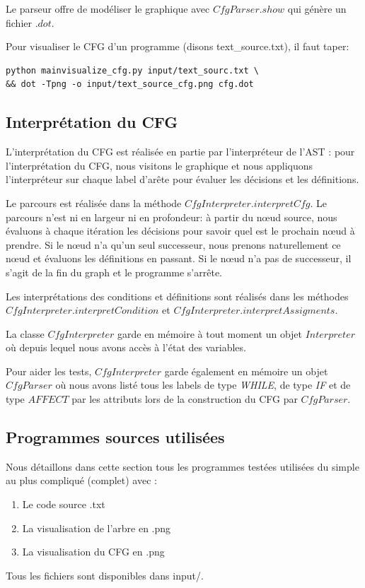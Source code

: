 \documentclass[a4paper]{article}
\begin{document}
Le parseur offre de modéliser le graphique avec $CfgParser.show$ qui génère un fichier $.dot$. 

Pour visualiser le CFG d'un programme (disons text\_source.txt), il faut taper:
\begin{verbatim}
python mainvisualize_cfg.py input/text_sourc.txt \
&& dot -Tpng -o input/text_source_cfg.png cfg.dot
\end{verbatim}

\subsection{Interprétation du CFG}

L'interprétation du CFG est réalisée en partie par l'interpréteur de l'AST : pour l'interprétation du CFG, nous visitons le graphique et nous appliquons l'interpréteur sur chaque label d'arête pour évaluer les décisions et les définitions.

Le parcours est réalisée dans la méthode $CfgInterpreter.interpretCfg$. Le parcours n'est ni en largeur ni en profondeur: à partir du nœud source, nous évaluons à chaque itération les décisions pour savoir quel est le prochain nœud à prendre. Si le nœud n'a qu'un seul successeur, nous prenons naturellement ce nœud et évaluons les définitions en passant. Si le nœud n'a pas de successeur, il s'agit de la fin du graph et le programme s'arrête.

Les interprétations des conditions et définitions sont réalisés dans les méthodes \\
$CfgInterpreter.interpretCondition$ et $CfgInterpreter.interpretAssigments$.

La classe $CfgInterpreter$ garde en mémoire à tout moment un objet $Interpreter$ où depuis lequel nous avons accès à l'état des variables. 

Pour aider les tests, $CfgInterpreter$ garde également en mémoire un objet $CfgParser$ où nous avons listé tous les labels de type \textit{WHILE}, de type \textit{IF} et de type $AFFECT$ par les attributs lors de la construction du CFG par $CfgParser$.

\subsection{Programmes sources utilisées} \label{code_source}

Nous détaillons dans cette section tous les programmes testées utilisées du simple au plus compliqué (complet) avec :
\begin{enumerate}
\item Le code source .txt
\item La visualisation de l'arbre en .png
\item La visualisation du CFG en .png 
\end{enumerate}
Tous les fichiers sont disponibles dans input/.
\end{document}
